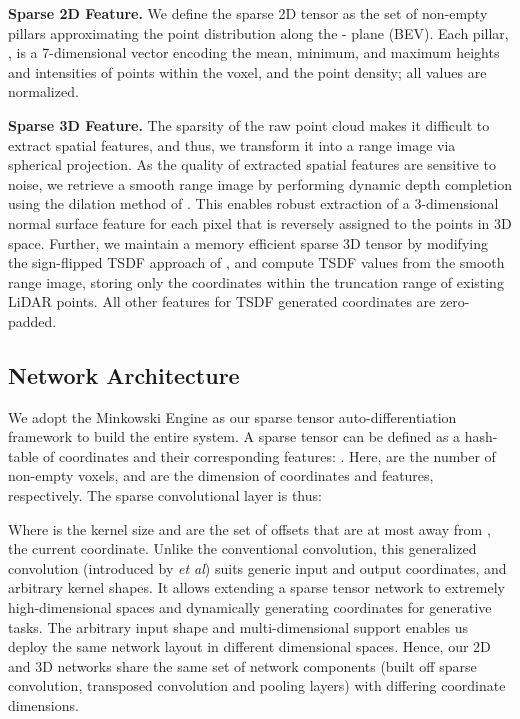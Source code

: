 \documentclass{article}
\begin{document}
\textbf{Sparse 2D Feature.} We define the sparse 2D tensor as the set of non-empty pillars approximating the point distribution along the - plane (BEV). Each pillar, , is a 7-dimensional vector encoding the mean, minimum, and maximum heights and intensities of points within the voxel, and the point density; all values are normalized. 



\textbf{Sparse 3D Feature.} The sparsity of the raw point cloud makes it difficult to extract spatial features, and thus, we transform it into a range image via spherical projection. As the quality of extracted spatial features are sensitive to noise, we retrieve a smooth range image by performing dynamic depth completion using the dilation method of \citet{ku2018defense}. This enables robust extraction of a 3-dimensional normal surface feature for each pixel that is reversely assigned to the points in 3D space. Further, we maintain a memory efficient sparse 3D tensor by modifying the sign-flipped TSDF approach of \citet{song2017semantic}, and compute TSDF values from the smooth range image, storing only the coordinates within the truncation range of existing LiDAR points. All other features for TSDF generated coordinates are zero-padded. 







\subsection{Network Architecture}
\label{sec:network_arch}



We adopt the Minkowski Engine \cite{choy20194d} as our sparse tensor auto-differentiation framework to build the entire system. A sparse tensor can be defined as a hash-table of coordinates and their corresponding features: . Here,  are the number of non-empty voxels,  and  are the dimension of coordinates and features, respectively. The sparse convolutional layer is thus:



Where  is the kernel size and  are the set of offsets that are at most  away from , the current coordinate. Unlike the conventional convolution, this generalized convolution (introduced by \citet{choy20194d} \emph{et al}) suits generic input and output coordinates, and arbitrary kernel shapes. It allows extending a sparse tensor network to extremely high-dimensional spaces and dynamically generating coordinates for generative tasks. The arbitrary input shape and multi-dimensional support enables us deploy the same network layout in different dimensional spaces. Hence, our 2D and 3D networks share the same set of network components (built off sparse convolution, transposed convolution and pooling layers) with differing coordinate dimensions.
\end{document}
